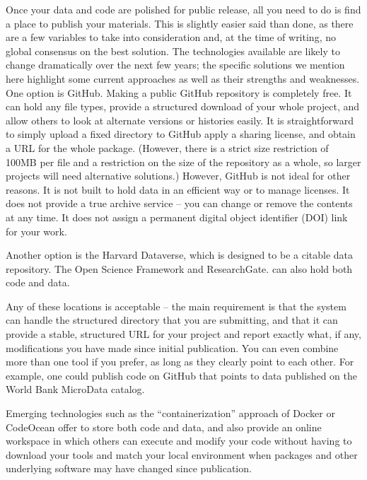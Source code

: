 Once your data and code are polished for public release,
all you need to do is find a place to publish your materials.
This is slightly easier said than done,
as there are a few variables to take into consideration
and, at the time of writing, no global consensus on the best solution.
The technologies available are likely to change dramatically
over the next few years;
the specific solutions we mention here highlight some current approaches
as well as their strengths and weaknesses.
One option is GitHub.
Making a public GitHub repository is completely free.
It can hold any file types,
provide a structured download of your whole project,
and allow others to look at alternate versions or histories easily.
It is straightforward to simply upload a fixed directory to GitHub
apply a sharing license, and obtain a URL for the whole package.
(However, there is a strict size restriction of 100MB per file and
a restriction on the size of the repository as a whole,
so larger projects will need alternative solutions.)
However, GitHub is not ideal for other reasons.
It is not built to hold data in an efficient way
or to manage licenses.
It does not provide a true archive service --
you can change or remove the contents at any time.
It does not assign a permanent digital object identifier (DOI) link for your work.

Another option is the Harvard Dataverse,
which is designed to be a citable data repository.
The Open Science Framework
and ResearchGate.
can also hold both code and data.

Any of these locations is acceptable --
the main requirement is that the system can handle
the structured directory that you are submitting,
and that it can provide a stable, structured URL for your project
and report exactly what, if any, modifications you have made since initial publication.
You can even combine more than one tool if you prefer,
as long as they clearly point to each other.
For example, one could publish code on GitHub that points to data published on the World Bank MicroData catalog. 

Emerging technologies such as the ``containerization'' approach of Docker or CodeOcean
offer to store both code and data,
and also provide an online workspace in which others can execute and modify your code
without having to download your tools and match your local environment
when packages and other underlying software may have changed since publication.

